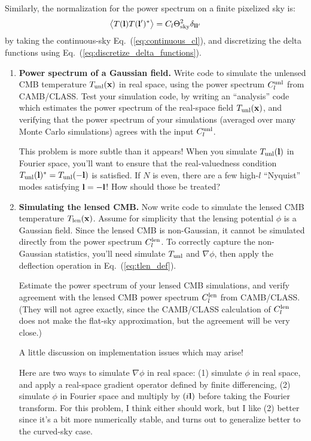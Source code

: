\documentclass[aps,prd,superscriptaddress,groupedaddress,nofootinbib,nobibnotes]{revtex4}
\newcommand{\be}{\begin{equation}}
\newcommand{\ee}{\end{equation}}
\def\x{{\bf x}}
\def\l{{\bf l}}
\begin{document}
Similarly, the normalization for the power spectrum on a finite pixelized sky is:
\be
\big\langle T(\l) T(\l')^* \big\rangle = C_l \Theta_{\rm sky}^2 \delta_{\l\l'}  \label{eq:discrete_cl}
\ee
by taking the continuous-sky Eq.~(\ref{eq:continuous_cl}), and discretizing
the delta functions using Eq.~(\ref{eq:discretize_delta_functions}).

\begin{enumerate}
\setcounter{enumi}{\value{enumi_save}}
  
\item {\bf Power spectrum of a Gaussian field.}
  Write code to simulate the unlensed CMB temperature $T_{\rm unl}(\x)$ in real space, using the power spectrum $C_l^{\rm unl}$
  from CAMB/CLASS.  Test your simulation code, by writing an ``analysis'' code which estimates the power spectrum of the real-space
  field $T_{\rm unl}(\x)$, and verifying that the power spectrum of your simulations (averaged over many Monte Carlo simulations)
  agrees with the input $C_l^{\rm unl}$.

  This problem is more subtle than it appears!  When you simulate $T_{\rm unl}(\l)$ in Fourier space, you'll want to
  ensure that the real-valuedness condition $T_{\rm unl}(\l)^* = T_{\rm unl}(-\l)$ is satisfied.  If $N$ is even, there
  are a few high-$l$ ``Nyquist'' modes satisfying $\l = -\l$!  How should those be treated?

\item {\bf Simulating the lensed CMB.}
  Now write code to simulate the lensed CMB temperature $T_{\rm len}(\x)$.
  Assume for simplicity that the lensing potential $\phi$ is a Gaussian field.
  Since the lensed CMB is non-Gaussian, it cannot be simulated directly from the power spectrum $C_l^{\rm len}$.
  To correctly capture the non-Gaussian statistics, you'll need simulate $T_{\rm unl}$ and $\nabla\phi$,
  then apply the deflection operation in Eq.~(\ref{eq:tlen_def}).
  
  Estimate the power spectrum of your lensed CMB simulations, and verify agreement with
  the lensed CMB power spectrum $C_l^{\rm len}$ from CAMB/CLASS.  (They will not agree exactly,
  since the CAMB/CLASS calculation of $C_l^{\rm len}$ does not make the flat-sky approximation,
  but the agreement will be very close.)

  A little discussion on implementation issues which may arise!
  
  Here are two ways to simulate $\nabla\phi$ in real space: (1) simulate $\phi$ in real space,
  and apply a real-space gradient operator defined by finite differencing, (2) simulate $\phi$
  in Fourier space and multiply by $(i\l)$ before taking the Fourier transform.
  For this problem, I think either should work, but I like (2) better since it's a bit more
  numerically stable, and turns out to generalize better to the curved-sky case.


\end{enumerate}
\end{document}
